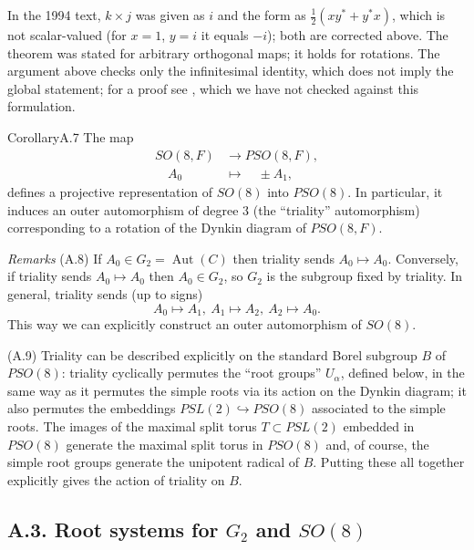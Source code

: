 \documentclass[12pt,letterpaper]{amsart}
\theoremstyle{plain}
\theoremstyle{definition}
\theoremstyle{remark}
\theoremstyle{definition}
\DeclareMathOperator{\Aut}{Aut}
\begin{document}
\begin{rem26}\label{rem:A2}
In the 1994 text, $k\times j$ was given as $i$ and the form as
$\frac12(xy^*+y^*x)$, which is not scalar-valued (for $x=1$, $y=i$ it equals
$-i$); both are corrected above. The theorem was stated for arbitrary
orthogonal maps; it holds for rotations. The argument above checks only the
infinitesimal identity, which does not imply the global statement; for a proof
see \cite[Ch.~3]{SV00}, which we have not checked against this formulation.
\end{rem26}

\begin{res}{Corollary}{A.7}\label{res:A.7} The map
\[
\begin{split}
SO(8,F) &\rightarrow PSO(8,F),\\
\quad A_0 &\longmapsto \quad \pm A_1,
\end{split}
\]
defines a projective representation of $SO(8)$ into
$PSO(8)$. In particular, it induces an outer automorphism of degree $3$
(the ``triality'' automorphism)
corresponding to a rotation of the Dynkin diagram of $PSO(8,F)$.
\end{res}

\noindent
\textit{Remarks} (A.8) If $A_0 \in G_2 = \Aut(C)$ then triality sends
$A_0 \longmapsto A_0$. Conversely, if triality sends $A_0 \longmapsto A_0$
then $A_0 \in G_2$, so $G_2$ is the subgroup fixed by triality. In
general, triality sends (up to signs)
\[
A_0 \longmapsto A_1,\ A_1 \longmapsto A_2,\ A_2 \longmapsto A_0.
\]
This way we can explicitly construct an outer automorphism of $SO(8)$.

(A.9) Triality can be described explicitly on the standard Borel
subgroup $B$ of $PSO(8)$: triality cyclically permutes the ``root groups''
$U_{\alpha}$, defined below, in the same way as it permutes the simple roots
via its action on the Dynkin diagram; it also permutes the embeddings
$PSL(2) \hookrightarrow PSO(8)$ associated to the simple roots. The
images of the maximal split torus $T \subset PSL(2)$ embedded in $PSO(8)$
generate the maximal split torus in $PSO(8)$ and, of course, the simple
root groups generate the unipotent radical of $B$. Putting these all together
explicitly gives the action of triality on $B$.

\subsection*{A.3. Root systems for \texorpdfstring{$G_2$ and $SO(8)$}{G2 and SO(8)}}
\end{document}
